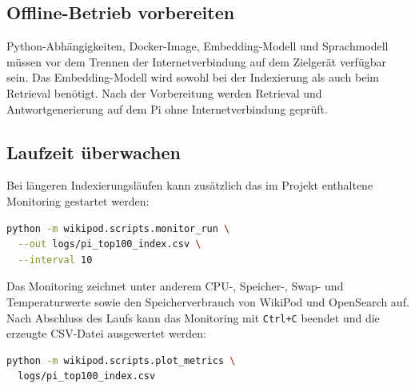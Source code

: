 \subsection{Offline-Betrieb vorbereiten}

Python-Abhängigkeiten, Docker-Image, Embedding-Modell und Sprachmodell müssen
vor dem Trennen der Internetverbindung auf dem Zielgerät verfügbar sein.
Das Embedding-Modell wird sowohl bei der Indexierung als auch beim Retrieval
benötigt. Nach der Vorbereitung werden Retrieval und Antwortgenerierung
auf dem Pi ohne Internetverbindung geprüft.

\subsection{Laufzeit überwachen}

\par\smallskip
\noindent\begin{minipage}[t]{\linewidth}
Bei längeren Indexierungsläufen kann zusätzlich das im Projekt enthaltene
Monitoring gestartet werden:

\par\nopagebreak[4]\smallskip
\noindent\begin{minipage}[t]{\linewidth}
\vspace{0pt}
\begin{lstlisting}[language=bash]
python -m wikipod.scripts.monitor_run \
  --out logs/pi_top100_index.csv \
  --interval 10
\end{lstlisting}
\end{minipage}\par\smallskip
\end{minipage}\par\smallskip

Das Monitoring zeichnet unter anderem CPU-, Speicher-, Swap- und
Temperaturwerte sowie den Speicherverbrauch von WikiPod und OpenSearch auf.
Nach Abschluss des Laufs kann das Monitoring mit \texttt{Ctrl+C} beendet und
die erzeugte CSV-Datei ausgewertet werden:

\par\nopagebreak[4]\smallskip
\noindent\begin{minipage}[t]{\linewidth}
\vspace{0pt}
\begin{lstlisting}[language=bash]
python -m wikipod.scripts.plot_metrics \
  logs/pi_top100_index.csv
\end{lstlisting}
\end{minipage}\par\smallskip


